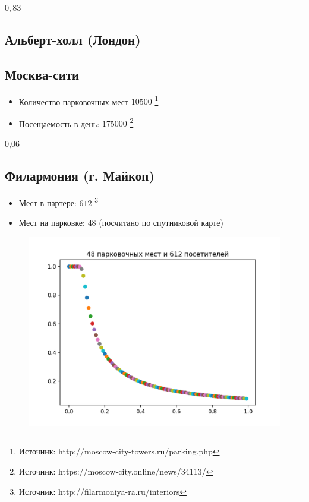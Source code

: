 $0,83$

\subsection{Альберт-холл (Лондон)}

\subsection{Москва-сити}
\begin{itemize}
	\item Количество парковочных мест $10 500$  \footnote{Источник: http://moscow-city-towers.ru/parking.php}
	\item Посещаемость в день:  $175 000$ \footnote{Источник: https://moscow-city.online/news/34113/}
\end{itemize}

0,06

\subsection{Филармония (г. Майкоп)}
\begin{itemize}
	\item Мест в партере: $612$ \footnote{Источник: http://filarmoniya-ra.ru/interiors}
	\item Мест на парковке: $48$ \small{(посчитано по спутниковой карте)}
\end{itemize}
\begin{figure}
	\includegraphics[scale=0.6]{img/612_48}	
\end{figure}

